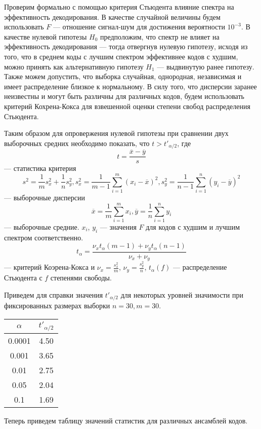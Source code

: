 Проверим формально с помощью критерия Стьюдента влияние спектра на эффективность декодирования.
В качестве случайной величины будем использовать $F$ --- отношение сигнал-шум для достижения вероятности
$10^{-3}$. В качестве нулевой гипотезы $H_0$ предположим, что спектр не влияет на эффективность декодирования
--- тогда отвергнув нулевую гипотезу, исходя из того, что в среднем коды с лучшим спектром эффективнее
кодов с худшим, можно принять как альтернативную гипотезу $H_1$ --- выдвинутую ранее гипотезу. Также
можем допустить, что выборка случайная, однородная, независимая и имеет распределение близкое к нормальному.
В силу того, что дисперсии заранее неизвестны и могут быть различны для различных кодов, будем
использовать критерий Кохрена-Кокса для взвешенной оценки степени свобод распределения Стьюдента.
\pagebreak

Таким образом для опровержения нулевой гипотезы при сравнении двух выборочных средних необходимо
показать, что $t > t'_{\alpha/2}$, где 
\[
	t=\frac{\overline{x}-\overline{y}}{s}
\]
--- статистика критерия
\[
 s^2=\frac{1}{m}s_x^2+\frac{1}{n}s_y^2,
	s_x^2=\frac{1}{m-1}\sum_{i=1}^{m}(x_i-\overline{x})^2,s_y^2=\frac{1}{n-1}\sum_{i=1}^{n}(y_i-\overline{y})^2
\]
--- выборочные дисперсии
\[
\overline{x}=\frac{1}{m}\sum_{i=1}^{m}x_i, \overline{y}=\frac{1}{n}\sum_{i=1}^{n}y_i
\]
--- выборочные средние. $x_i$, $y_i$ --- значения $F$ для кодов с худшим и лучшим спектром соответственно.
\[
	t_{\alpha}=\frac{\nu_x t_{\alpha}(m-1)+\nu_y t_{\alpha}(n-1)}{\nu_x+\nu_y}
\]
--- критерий Коэрена-Кокса
и $\nu_x=\frac{s_x^2}{m}$, $\nu_y=\frac{s_y^2}{n}$, $t_{\alpha}(f)$ --- распределение Стьюдента с $f$
степенями свободы.

Приведем для справки значения $t'_{\alpha/2}$ для некоторых уровней значимости при фиксированных
размерах выборки $n=30, m=30$.

\begin{tabular}{|c|c|}
	\hline
	$\alpha$ & $t'_{\alpha/2}$ \\
	\hline
	0.0001 & 4.50 \\
	\hline
	0.001 & 3.65 \\
	\hline
	0.01 & 2.75 \\
	\hline
	0.05 & 2.04 \\
	\hline
	0.1 & 1.69 \\
	\hline
\end{tabular}

Теперь приведем таблицу значений статистик для различных ансамблей кодов.

